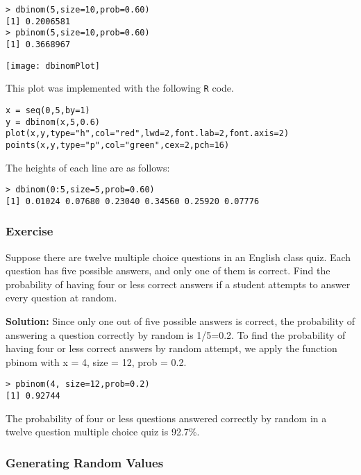 \documentclass[a4paper,12pt]{article}
\begin{document}
\begin{verbatim}
> dbinom(5,size=10,prob=0.60)
[1] 0.2006581
> pbinom(5,size=10,prob=0.60)
[1] 0.3668967
\end{verbatim}

 \begin{center}
 \texttt{[image: dbinomPlot]}
 \end{center}
 
This plot was implemented with the following \texttt{R} code.
\begin{framed}
\begin{verbatim}
x = seq(0,5,by=1)
y = dbinom(x,5,0.6)
plot(x,y,type="h",col="red",lwd=2,font.lab=2,font.axis=2)
points(x,y,type="p",col="green",cex=2,pch=16)
\end{verbatim}
\end{framed}
The heights of each line are as follows:
\begin{verbatim}
> dbinom(0:5,size=5,prob=0.60)
[1] 0.01024 0.07680 0.23040 0.34560 0.25920 0.07776
\end{verbatim}

\subsubsection{Exercise}
Suppose there are twelve multiple choice questions in an English class quiz. Each question has five possible answers, and only one of them is correct. Find the probability of having four or less correct answers if a student attempts to answer every question at random. 

\textbf{Solution:} Since only one out of five possible answers is correct, the probability of answering a question correctly by random is 1/5=0.2. To find the probability of having four or less correct answers by random attempt, we apply the function pbinom with x = 4, size = 12, prob = 0.2. 

\begin{verbatim}
> pbinom(4, size=12,prob=0.2) 
[1] 0.92744 
\end{verbatim}

The probability of four or less questions answered correctly by random in a twelve question multiple choice quiz is 92.7\%. 
 
\subsubsection{Generating Random Values}
\end{document}
